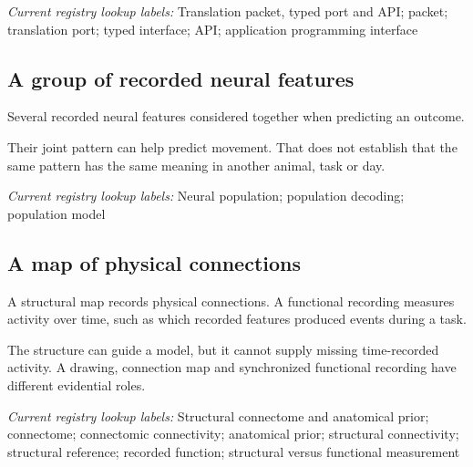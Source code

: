 \noindent\textit{Current registry lookup labels:} Translation packet, typed port and API; packet; translation port; typed interface; API; application programming interface\par

\begin{samepage}
\subsection*{A group of recorded neural features}
\noindent Several recorded neural features considered together when predicting an outcome.\par
\end{samepage}
\begin{samepage}
\noindent Their joint pattern can help predict movement. That does not establish that the same pattern has the same meaning in another animal, task or day.\par\nopagebreak[4]

\end{samepage}


\noindent\textit{Current registry lookup labels:} Neural population; population decoding; population model\par

\begin{samepage}
\subsection*{A map of physical connections}
\noindent A structural map records physical connections. A functional recording measures activity over time, such as which recorded features produced events during a task.\par
\end{samepage}
\begin{samepage}
\noindent The structure can guide a model, but it cannot supply missing time-recorded activity. A drawing, connection map and synchronized functional recording have different evidential roles.\par\nopagebreak[4]

\end{samepage}


\noindent\textit{Current registry lookup labels:} Structural connectome and anatomical prior; connectome; connectomic connectivity; anatomical prior; structural connectivity; structural reference; recorded function; structural versus functional measurement\par


